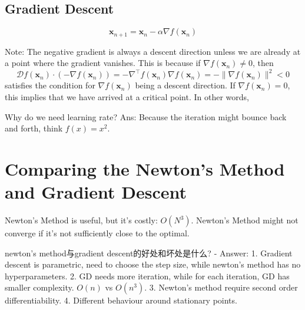 \documentclass[11pt]{article}
\theoremstyle{plain} %
\newenvironment{topic}
{\color{C2}\normalfont\begin{framed}\begingroup }
  {\endgroup\end{framed}}
\theoremstyle{remark}
\begin{document}
\subsection{Gradient Descent}
\begin{topic}
  $$
    \mathbf{x}_{n+1}=\mathbf{x}_n-\alpha \nabla f\left(\mathbf{x}_n\right)
  $$

  Note: The negative gradient is always a descent direction unless we are already at a point where the gradient vanishes.
  This is because if $\nabla f\left(\mathbf{x}_n\right) \neq 0$, then
  $$
    \mathcal{D} f\left(\mathbf{x}_n\right) \cdot \left(-\nabla f\left(\mathbf{x}_n\right)\right)
    = -\nabla^\top f\left(\mathbf{x}_n\right)\nabla f\left(\mathbf{x}_n\right)
    = - \|\nabla f\left(\mathbf{x}_n\right) \|^2 < 0
  $$ satisfies the condition for $\nabla f\left(\mathbf{x}_n\right)$ being a descent direction.
  If $\nabla f\left(\mathbf{x}_n\right) = 0$, this implies that we have arrived at a critical point.
  In other words, 

  Why do we need learning rate?
  Ans: Because the iteration might bounce back and forth, think $f(x) = x^2$.

\end{topic}






\section{Comparing the Newton's Method and Gradient Descent}
\begin{topic}
  Newton's Method is useful, but it's costly: $O(N^3)$. Newton's Method might
  not converge if it's not sufficiently close to the optimal.


  newton's method与gradient descent的好处和坏处是什么? - Answer: 1. Gradient
  descent is parametric, need to choose the step size, while newton's method has
  no hyperparameters. 2. GD needs more iteration, while for each iteration, GD has
  smaller complexity. $O(n)$ vs $O(n^3)$. 3. Newton's method require second order
  differentiability. 4. Different behaviour around stationary points.
\end{topic}
\end{document}
